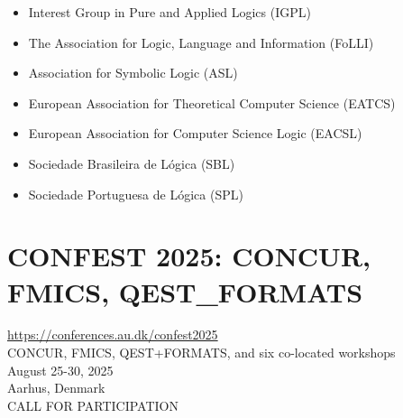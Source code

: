 \documentclass[prodmode,acmtecs]{acmsmall} %
\begin{document}
\begin{itemize}
\begin{itemize}\item  Interest Group in Pure and Applied Logics (IGPL)
\item  The Association for Logic, Language and Information (FoLLI)
\item  Association for Symbolic Logic (ASL)
\item  European Association for Theoretical Computer Science (EATCS)
\item  European Association for Computer Science Logic (EACSL)
\item  Sociedade Brasileira de Lógica (SBL)
\item  Sociedade Portuguesa de Lógica (SPL)
\end{itemize} 
\end{itemize}\section{CONFEST 2025: CONCUR, FMICS, QEST\_FORMATS}\label{CONFEST2025}  \href{https://conferences.au.dk/confest2025}{https://conferences.au.dk/confest2025}\\ 
  CONCUR, FMICS, QEST+FORMATS, and six co-located workshops\\ 
  August 25-30, 2025\\ 
  Aarhus, Denmark\\ 
CALL FOR PARTICIPATION 
\end{document}
